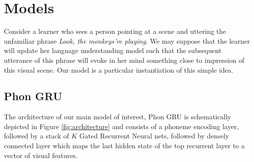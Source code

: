 \section{Models}
Consider a learner who sees a person pointing at a scene and uttering
the unfamiliar phrase
{\it Look, the monkeys're playing}. We may suppose that the learner
will update her language understanding model such that the
subsequent utterance of this phrase will evoke in her mind something
close to impression of this visual scene. Our model is a particular
instantiation of this simple idea.
\subsection{Phon GRU}
The architecture of our main model of interest, {\sc Phon GRU} is
schematically depicted in Figure \ref{fig:architecture} and consists of a phoneme
encoding  layer, followed by a stack of $K$ Gated Recurrent Neural
nets, followed by densely connected layer which maps the last hidden
state of the top recurrent layer to a vector of visual features.

